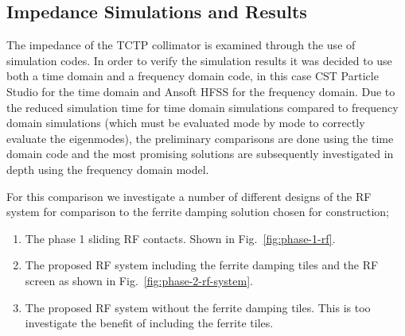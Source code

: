 \subsection{Impedance Simulations and Results}
\label{sec:imp-sims-tctp}

The impedance of the TCTP collimator is examined through the use of simulation codes. In order to verify the simulation results it was decided to use both a time domain and a frequency domain code, in this case CST Particle Studio for the time domain and Ansoft HFSS for the frequency domain. Due to the reduced simulation time for time domain simulations compared to frequency domain simulations (which must be evaluated mode by mode to correctly evaluate the eigenmodes), the preliminary comparisons are done using the time domain code and the most promising solutions are subsequently investigated in depth using the frequency domain model.

For this comparison we investigate a number of different designs of the RF system for comparison to the ferrite damping solution chosen for construction;

\begin{enumerate}
\item{The phase 1 sliding RF contacts. Shown in Fig.~\ref{fig:phase-1-rf}.}
\item{The proposed RF system including the ferrite damping tiles and the RF screen as shown in Fig.~\ref{fig:phase-2-rf-system}.}
\item{The proposed RF system without the ferrite damping tiles. This is too investigate the benefit of including the ferrite tiles.}
\end{enumerate}


